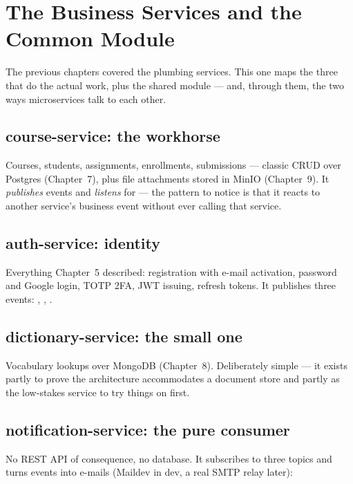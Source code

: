 \chapter{The Business Services and the Common Module}
\label{ch:services}

The previous chapters covered the plumbing services. This one maps the
three that do the actual work, plus the shared  module ---
and, through them, the two ways microservices talk to each other.

\section{course-service: the workhorse}

Courses, students, assignments, enrollments, submissions --- classic
CRUD over Postgres (Chapter~7), plus file attachments stored in MinIO
(Chapter~9). It \emph{publishes}  events and
\emph{listens} for  --- the pattern to notice is
that it reacts to another service's business event without ever calling
that service.

\section{auth-service: identity}

Everything Chapter~5 described: registration with e-mail activation,
password and Google login, TOTP 2FA, JWT issuing, refresh tokens. It
publishes three events: ,
, .

\section{dictionary-service: the small one}

Vocabulary lookups over MongoDB (Chapter~8). Deliberately simple --- it
exists partly to prove the architecture accommodates a document store and
partly as the low-stakes service to try things on first.

\section{notification-service: the pure consumer}

No REST API of consequence, no database. It subscribes to three topics
and turns events into e-mails (Maildev in dev, a real SMTP relay later):

